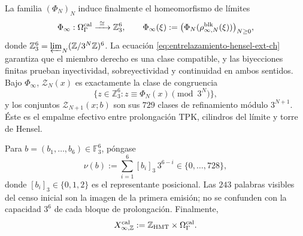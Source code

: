 La familia \((\Phi_N)_N\) induce finalmente el homeomorfismo de límites
\begin{equation}
 \Phi_\infty:\Omega_\Gamma^{\rm cal}
 \xrightarrow{\ \cong\ }\mathbb Z_3^6,\qquad
 \Phi_\infty(\xi):=
 \bigl(\Phi_N(\rho^{\rm blk}_{\infty,N}(\xi))\bigr)_{N\ge0},
 \label{eq:phi-infinito-hensel-ext-ch}
\end{equation}
donde
\(\mathbb Z_3^6=\varprojlim_N(\mathbb Z/3^N\mathbb Z)^6\).
La ecuación \eqref{eq:entrelazamiento-hensel-ext-ch} garantiza que el miembro
derecho es una clase compatible, y las biyecciones finitas prueban
inyectividad, sobreyectividad y continuidad en ambos sentidos. Bajo
\(\Phi_\infty\), \(\mathscr Z_N(x)\) es exactamente la clase de congruencia
\[
 \{z\in\mathbb Z_3^6:z\equiv\Phi_N(x)\pmod{3^N}\},
\]
y los conjuntos \(\mathscr Z_{N+1}(x;b)\) son sus \(729\) clases de refinamiento
módulo \(3^{N+1}\). Éste es el empalme efectivo entre prolongación TPK,
cilindros del límite y torre de Hensel.

Para \(b=(b_1,\ldots,b_6)\in\mathbb F_3^6\), póngase
\[
 \nu(b):=\sum_{i=1}^{6}[b_i]_3\,3^{6-i}
 \in\{0,\ldots,728\},
\tag{40c$_0$}
\label{eq:valor-bloque-ch}
\]
donde \([b_i]_3\in\{0,1,2\}\) es el representante posicional. Las
\(243\) palabras visibles del censo inicial son la imagen de la primera
emisión; no se confunden con la capacidad \(3^6\) de cada bloque de
prolongación. Finalmente,
\[
 X_{\infty,\mathbb Z}^{\rm cal}
 :=\mathbb Z_{\rm HMT}\times\Omega_\Gamma^{\rm cal}.
\]
